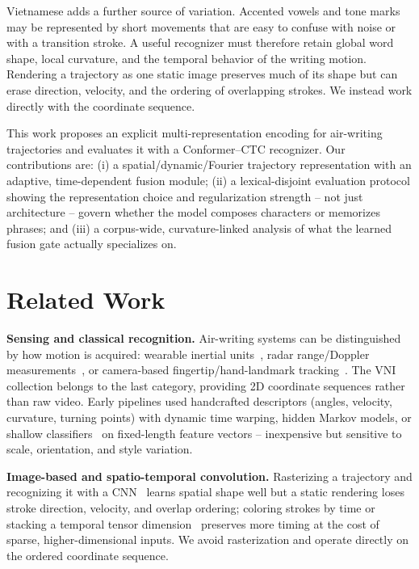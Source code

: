 \documentclass[runningheads]{llncs}
\begin{document}
Vietnamese adds a further source of variation. Accented vowels and tone marks may be represented by short movements that are easy to confuse with noise or with a transition stroke. A useful recognizer must therefore retain global word shape, local curvature, and the temporal behavior of the writing motion. Rendering a trajectory as one static image preserves much of its shape but can erase direction, velocity, and the ordering of overlapping strokes. We instead work directly with the coordinate sequence.

This work proposes an explicit multi-representation encoding for air-writing trajectories and evaluates it with a Conformer--CTC recognizer. Our contributions are: (i) a spatial/dynamic/Fourier trajectory representation with an adaptive, time-dependent fusion module; (ii) a lexical-disjoint evaluation protocol showing the representation choice and regularization strength -- not just architecture -- govern whether the model composes characters or memorizes phrases; and (iii) a corpus-wide, curvature-linked analysis of what the learned fusion gate actually specializes on.

\section{Related Work}
\noindent\textbf{Sensing and classical recognition.} Air-writing systems can be distinguished by how motion is acquired: wearable inertial units~\cite{airwriting}, radar range/Doppler measurements~\cite{arsalan}, or camera-based fingertip/hand-landmark tracking~\cite{alamdepth,watanabe}. The VNI collection belongs to the last category, providing 2D coordinate sequences rather than raw video. Early pipelines used handcrafted descriptors (angles, velocity, curvature, turning points) with dynamic time warping, hidden Markov models, or shallow classifiers~\cite{rumelhart} on fixed-length feature vectors -- inexpensive but sensitive to scale, orientation, and style variation.

\noindent\textbf{Image-based and spatio-temporal convolution.} Rasterizing a trajectory and recognizing it with a CNN~\cite{alamcnn,lamaakal,roy} learns spatial shape well but a static rendering loses stroke direction, velocity, and overlap ordering; coloring strokes by time or stacking a temporal tensor dimension~\cite{chang,kimst} preserves more timing at the cost of sparse, higher-dimensional inputs. We avoid rasterization and operate directly on the ordered coordinate sequence.
\end{document}
